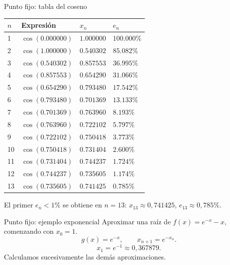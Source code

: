 \documentclass[original_version/main.tex]{subfiles}
\begin{document}
\begin{frame}{Punto fijo: tabla del coseno}
{\scriptsize\setlength{\tabcolsep}{5pt}\begin{center}\begin{tabular}{|C{.07\textwidth}|C{.35\textwidth}|C{.2\textwidth}|C{.2\textwidth}|}\hline $n$ & Expresión & $x_n$ & $e_n$\\\hline
\rule{0pt}{3.2mm}1 & $\cos(0.000000)$ & $1.000000$ & $100.000\%$\\\hline
\rule{0pt}{3.2mm}2 & $\cos(1.000000)$ & $0.540302$ & $85.082\%$\\\hline
\rule{0pt}{3.2mm}3 & $\cos(0.540302)$ & $0.857553$ & $36.995\%$\\\hline
\rule{0pt}{3.2mm}4 & $\cos(0.857553)$ & $0.654290$ & $31.066\%$\\\hline
\rule{0pt}{3.2mm}5 & $\cos(0.654290)$ & $0.793480$ & $17.542\%$\\\hline
\rule{0pt}{3.2mm}6 & $\cos(0.793480)$ & $0.701369$ & $13.133\%$\\\hline
\rule{0pt}{3.2mm}7 & $\cos(0.701369)$ & $0.763960$ & $8.193\%$\\\hline
\rule{0pt}{3.2mm}8 & $\cos(0.763960)$ & $0.722102$ & $5.797\%$\\\hline
\rule{0pt}{3.2mm}9 & $\cos(0.722102)$ & $0.750418$ & $3.773\%$\\\hline
\rule{0pt}{3.2mm}10 & $\cos(0.750418)$ & $0.731404$ & $2.600\%$\\\hline
\rule{0pt}{3.2mm}11 & $\cos(0.731404)$ & $0.744237$ & $1.724\%$\\\hline
\rule{0pt}{3.2mm}12 & $\cos(0.744237)$ & $0.735605$ & $1.174\%$\\\hline
\rule{0pt}{3.2mm}13 & $\cos(0.735605)$ & $0.741425$ & $0.785\%$\\\hline
\end{tabular}\end{center}}\footnotesize El primer $e_n<1\%$ se obtiene en $n=13$: $x_{13}\approx0{,}741425$, $e_{13}\approx0{,}785\%$.
\end{frame}

\begin{frame}{Punto fijo: ejemplo exponencial}
Aproximar una raíz de $f(x)=e^{-x}-x$, comenzando con $x_0=1$.\[g(x)=e^{-x},\qquad x_{n+1}=e^{-x_n}.\]\[x_1=e^{-1}\approx0{,}367879.\]Calculamos sucesivamente las demás aproximaciones.
\end{frame}
\end{document}
